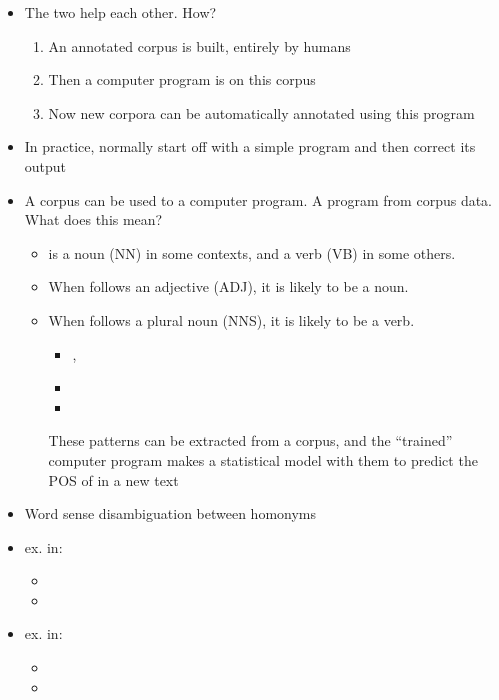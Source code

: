 \documentclass[a4paper,landscape,headrule,footrule,xetex]{foils}
\begin{document}
\begin{itemize}
\item  The two help each other. How?
  \begin{enumerate}
  \item An annotated corpus is built, entirely by humans
  \item Then a computer program is  on this corpus
  \item Now new corpora can be automatically annotated using this program
  \end{enumerate}
\item In practice, normally start off with a simple program and then correct its output
\end{itemize}
\begin{itemize}
\item  A corpus can be used to  a computer program. A program
 from corpus data. What does this mean?
\begin{itemize}
\item {} is a noun (NN) in some contexts, and a verb (VB) in some others.
\item When  follows an adjective (ADJ), it is likely to be a noun.
\item When  follows a plural noun (NNS), it is likely to be a verb.
  \begin{itemize}
  \item  {}, 
  \item  {}
  \item {} 
  \end{itemize}
  These patterns can be extracted from a corpus, and the ``trained''
  computer program makes a statistical model with them to predict the
  POS of  in a new text
\end{itemize}
\end{itemize}

\begin{itemize}
\item  Word sense disambiguation between homonyms
\item  ex.  in:
  \begin{itemize}
  \item  {}
  \item  {}
  \end{itemize}
\item  ex.  in:
  \begin{itemize}
  \item  {}
  \item  {}
  \end{itemize}
\end{itemize}
\end{document}

